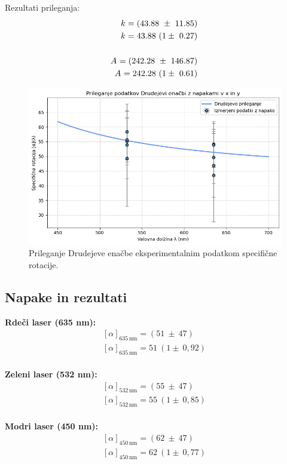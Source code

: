 \documentclass[9pt,a4paper,twocolumn,twoside]{tau-class/tau}
\newcommand{\abserr}[5]{
    \ensuremath{#1_{#2} = (#3 \ \pm \ #4) \ #5}
}
\newcommand{\relerr}[5]{
    \ensuremath{#1_{#2} = #3 \ (1 \pm \ #4) \ #5}
}
\begin{document}
Rezultati prileganja:
\begin{align*}
\abserr{k}{}{43.88}{11.85}{} \\
\relerr{k}{}{43.88}{0.27}{} \\\\
\noindent \abserr{A}{}{242.28}{146.87}{} \\
\relerr{A}{}{242.28}{0.61}{}
\end{align*}

\begin{figure}[H]
    \centering
    \includegraphics[width=0.9\linewidth]{specrot.png}
    \caption{Prileganje Drudejeve enačbe eksperimentalnim podatkom specifične rotacije.}
    \label{fig:specrot}
\end{figure}

\subsection{Napake in rezultati}

\textbf{Rdeči laser (635 nm):}
\begin{align*}
\abserr{[\alpha]}{635\,\text{nm}}{51}{47}{} \\
\relerr{[\alpha]}{635\,\text{nm}}{51}{0,92}{} \\
\end{align*}

\textbf{Zeleni laser (532 nm):}
\begin{align*}
\abserr{[\alpha]}{532\,\text{nm}}{55}{47}{} \\
\relerr{[\alpha]}{532\,\text{nm}}{55}{0,85}{} \\
\end{align*}

\textbf{Modri laser (450 nm):}
\begin{align*}
\abserr{[\alpha]}{450\,\text{nm}}{62}{47}{} \\
\relerr{[\alpha]}{450\,\text{nm}}{62}{0,77}{}
\end{align*}
\end{document}
